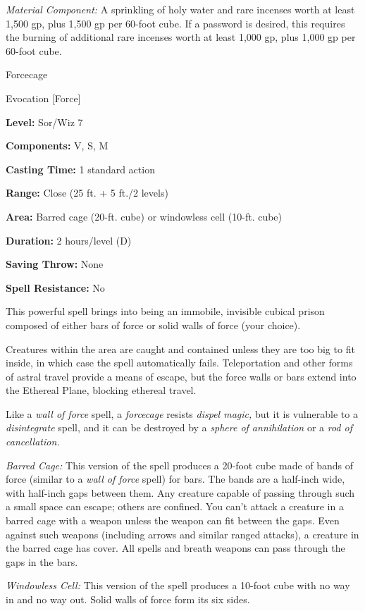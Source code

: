 \documentclass{article}
\begin{document}
\textit{Material Component: }A sprinkling of holy water and rare incenses worth 
at least 1,500 gp, plus 1,500 gp per 60-foot cube. If a password is desired, this 
requires the burning of additional rare incenses worth at least 1,000 gp, plus 
1,000 gp per 60-foot cube.

\vspace{12pt}
Forcecage

Evocation [Force]

\textbf{Level:} Sor/Wiz 7

\textbf{Components:} V, S, M

\textbf{Casting Time:} 1 standard action

\textbf{Range:} Close (25 ft. + 5 ft./2 levels)

\textbf{Area:} Barred cage (20-ft. cube) or windowless cell (10-ft. cube)

\textbf{Duration:} 2 hours/level (D)

\textbf{Saving Throw:} None

\textbf{Spell Resistance:} No

This powerful spell brings into being an immobile, invisible cubical prison composed 
of either bars of force or solid walls of force (your choice).

Creatures within the area are caught and contained unless they are too big to fit 
inside, in which case the spell automatically fails. Teleportation and other forms 
of astral travel provide a means of escape, but the force walls or bars extend 
into the Ethereal Plane, blocking ethereal travel.

Like a \textit{wall of force }spell, a \textit{forcecage }resists \textit{dispel 
magic, }but it is vulnerable to a \textit{disintegrate }spell, and it can be destroyed 
by a \textit{sphere of annihilation }or a \textit{rod of cancellation.}

\textit{Barred Cage: }This version of the spell produces a 20-foot cube made of 
bands of force (similar to a \textit{wall of force }spell) for bars. The bands 
are a half-inch wide, with half-inch gaps between them. Any creature capable of 
passing through such a small space can escape; others are confined. You can't attack 
a creature in a barred cage with a weapon unless the weapon can fit between the 
gaps. Even against such weapons (including arrows and similar ranged attacks), 
a creature in the barred cage has cover. All spells and breath weapons can pass 
through the gaps in the bars.

\textit{Windowless Cell: }This version of the spell produces a 10-foot cube with 
no way in and no way out. Solid walls of force form its six sides.
\end{document}
